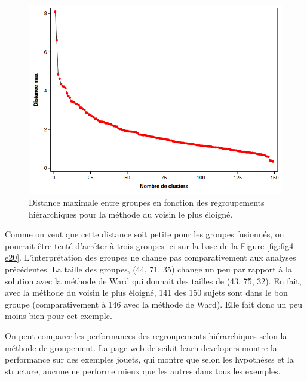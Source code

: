 \documentclass[
  11pt,
  letterpaper,
]{book}
\theoremstyle{definition}
\theoremstyle{definition}
\theoremstyle{definition}
\theoremstyle{remark}
\begin{document}
\begin{figure}

{\centering \includegraphics[width=0.8\linewidth]{figures/04-clustering-e21} 

}

\caption{Distance maximale entre groupes en fonction des regroupements hiérarchiques pour la méthode du voisin le plus éloigné.}\label{fig:fig4-e21}
\end{figure}

Comme on veut que cette distance soit petite pour les groupes fusionnés, on pourrait être tenté d'arrêter à trois groupes ici sur la base de la Figure \ref{fig:fig4-e20}. L'interprétation des groupes ne change pas comparativement aux analyses précédentes. La taille des groupes, (44, 71, 35) change un peu par rapport à la solution avec la méthode de Ward qui donnait des tailles de (43, 75, 32). En fait, avec la méthode du voisin le plus éloigné, 141 des 150 sujets sont dans le bon groupe (comparativement à 146 avec la méthode de Ward). Elle fait donc un peu moins bien pour cet exemple.

On peut comparer les performances des regroupements hiérarchiques selon la méthode de groupement. La \href{https://scikit-learn.org/stable/auto_examples/cluster/plot_linkage_comparison.html}{page web de scikit-learn developers} montre la performance sur des exemples jouets, qui montre que selon les hypothèses et la structure, aucune ne performe mieux que les autres dans tous les exemples.
\end{document}

